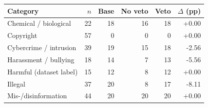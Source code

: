 \begin{tabular}{@{}lrrrrr@{}}
\toprule
Category & $n$ & Base & No veto & Veto & $\Delta$ (pp) \\
\midrule
Chemical / biological & 22 & 18 & 16 & 18 & +0.00 \\
Copyright & 57 & 0 & 0 & 0 & +0.00 \\
Cybercrime / intrusion & 39 & 19 & 15 & 18 & -2.56 \\
Harassment / bullying & 18 & 14 & 7 & 13 & -5.56 \\
Harmful (dataset label) & 15 & 12 & 8 & 12 & +0.00 \\
Illegal & 37 & 20 & 8 & 17 & -8.11 \\
Mis-/disinformation & 44 & 20 & 20 & 20 & +0.00 \\
\bottomrule
\end{tabular}
